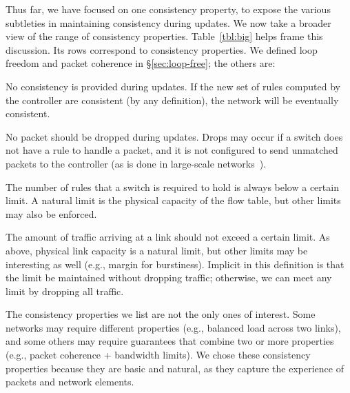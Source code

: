 Thus far, we have focused on one consistency property, to expose the various subtleties in maintaining consistency during updates. We now take a broader view of the range of consistency properties. Table~\ref{tbl:big} helps frame this discussion. Its rows correspond to consistency properties. We defined loop freedom and packet coherence in \S\ref{sec:loop-free}; the others are:

 No consistency is provided during updates. If the new set of rules computed by the controller are consistent (by any definition), the network will be eventually consistent.

 No packet should be dropped during updates. Drops may occur if a switch does not have a rule to handle a packet, and it is not configured to send unmatched packets to the controller (as is done in large-scale networks~\cite{swan,b4}).



 The number of rules that a switch is required to hold is always below a certain limit. A natural limit is the physical capacity of the flow table, but other limits may also be enforced.

 The amount of traffic arriving at a link should not exceed a certain limit. As above, physical link capacity is a natural limit, but other limits may be interesting as well (e.g., margin for burstiness). Implicit in this definition is that the limit be maintained without dropping traffic; otherwise, we can meet any limit by dropping all traffic.

The consistency properties we list are not the only ones of interest.
Some networks may require different properties (e.g., balanced load across two links), and some others may require  guarantees that combine two or more properties (e.g., packet coherence + bandwidth limits). We chose these consistency properties because they are basic and natural, as they capture the experience of packets and network elements.

